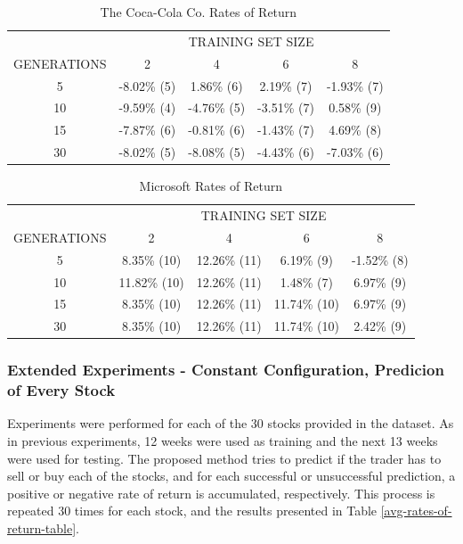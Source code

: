 \documentclass[a4paper,twoside]{article}
\begin{document}
\begin{table}
\caption{{The Coca-Cola Co. Rates of Return}}
\label{ko-ror-table}
    \begin{tabular}{ c c c c c }
         & \multicolumn{4}{c}{TRAINING SET SIZE} \\ 
        GENERATIONS & 2            & 4           & 6             & 8           \\ 
        5           & -8.02\% (5)  & 1.86\% (6)  & 2.19\% (7)    & -1.93\% (7) \\ 
        10          & -9.59\% (4)  & -4.76\% (5) & -3.51\% (7)   & 0.58\% (9) \\ 
        15          & -7.87\% (6)  & -0.81\% (6) & -1.43\% (7)   & 4.69\% (8) \\ 
        30          & -8.02\% (5)  & -8.08\% (5) & -4.43\% (6)   & -7.03\% (6)  \\ 
    \end{tabular} 
\end{table}

\begin{table}
\caption{{Microsoft Rates of Return}}
\label{msft-ror-table}
    \begin{tabular}{ c c c c c }
         & \multicolumn{4}{c}{TRAINING SET SIZE} \\ 
        GENERATIONS & 2            & 4           & 6             & 8           \\ 
        5           & 8.35\% (10)  & 12.26\% (11) & 6.19\% (9)   & -1.52\% (8) \\ 
        10          & 11.82\% (10) & 12.26\% (11) & 1.48\% (7)   & 6.97\% (9) \\ 
        15          & 8.35\% (10)  & 12.26\% (11) & 11.74\% (10) & 6.97\% (9) \\ 
        30          & 8.35\% (10)  & 12.26\% (11) & 11.74\% (10) & 2.42\% (9)  \\ 
    \end{tabular} 
\end{table}

\subsubsection{Extended Experiments - Constant Configuration, Predicion of Every Stock}

Experiments were performed for each of the 30 stocks provided in the dataset. As in previous experiments, 12 weeks were used as training and the next 13 weeks were used for testing. The proposed method tries to predict if the trader has to sell or buy each of the stocks, and for each successful or unsuccessful prediction, a positive or negative rate of return is accumulated, respectively. This process is repeated 30 times for each stock, and the results presented in Table \ref{avg-rates-of-return-table}.
\end{document}
